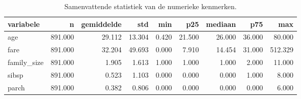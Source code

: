 \begin{table}[htbp]
\caption{Samenvattende statistiek van de numerieke kenmerken.}
\label{tab:beschrijvend}
\begin{tabular}{lrrrrrrrr}
\toprule
variabele & n & gemiddelde & std & min & p25 & mediaan & p75 & max \\
\midrule
age & 891.000 & 29.112 & 13.304 & 0.420 & 21.500 & 26.000 & 36.000 & 80.000 \\
fare & 891.000 & 32.204 & 49.693 & 0.000 & 7.910 & 14.454 & 31.000 & 512.329 \\
family\_size & 891.000 & 1.905 & 1.613 & 1.000 & 1.000 & 1.000 & 2.000 & 11.000 \\
sibsp & 891.000 & 0.523 & 1.103 & 0.000 & 0.000 & 0.000 & 1.000 & 8.000 \\
parch & 891.000 & 0.382 & 0.806 & 0.000 & 0.000 & 0.000 & 0.000 & 6.000 \\
\bottomrule
\end{tabular}
\end{table}
